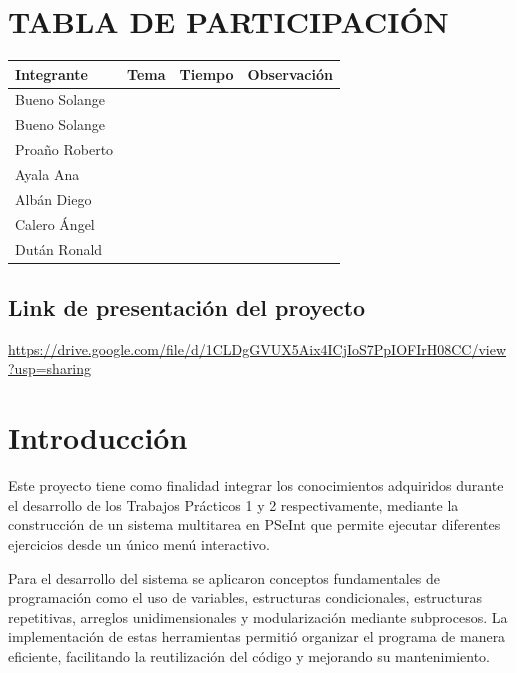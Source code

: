 \documentclass[12pt,a4paper]{article}
\begin{document}
\section*{TABLA DE PARTICIPACIÓN}

\vspace{0.5cm}

\begin{center}
	\begin{tabular}{|p{4cm}|p{4cm}|p{3cm}|p{4cm}|}
		\hline
		\textbf{Integrante} & \textbf{Tema} & \textbf{Tiempo} & \textbf{Observación} \\ \hline
		Bueno Solange & & & \\ \hline
		Bueno Solange & & & \\ \hline
		Proaño Roberto & & & \\ \hline
		Ayala Ana & & & \\ \hline
		Albán Diego & & & \\ \hline
		Calero Ángel & & & \\ \hline
		Dután Ronald & & & \\ \hline
	
	\end{tabular}
\end{center}

\vspace{1.5cm}
\subsection*{\Large \color {red} Link de presentación del proyecto}

\url {https://drive.google.com/file/d/1CLDgGVUX5Aix4ICjIoS7PpIOFIrH08CC/view?usp=sharing}



\newpage
\section{\textcolor{azulUNEMI}{Introducción}}


Este proyecto tiene como finalidad integrar los conocimientos adquiridos durante el desarrollo de los Trabajos Prácticos 1 y 2 respectivamente, mediante la construcción de un sistema multitarea en PSeInt que permite ejecutar diferentes ejercicios desde un único menú interactivo.

Para el desarrollo del sistema se aplicaron conceptos fundamentales de programación como el uso de variables, estructuras condicionales, estructuras repetitivas, arreglos unidimensionales y modularización mediante subprocesos. La implementación de estas herramientas permitió organizar el programa de manera eficiente, facilitando la reutilización del código y mejorando su mantenimiento.
\end{document}
